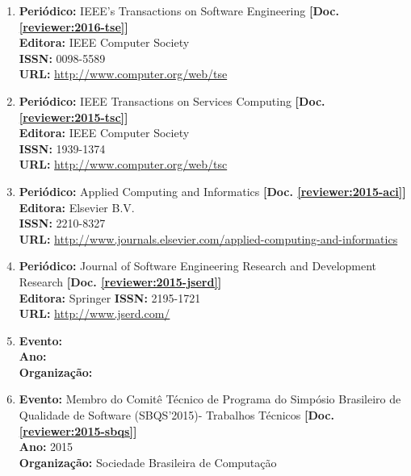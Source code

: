 \documentclass[a4paper,oneside,10pt]{article}
\begin{document}
\begin{enumerate}
\renewcommand{\labelenumi}{{\large\bfseries\arabic{enumi}.}}

\item   \textbf{Peri\'{o}dico:} IEEE’s Transactions on Software Engineering \textbf{[Doc. \ref{reviewer:2016-tse}]}\\
        \textbf{Editora:} IEEE Computer Society\\
        \textbf{ISSN:} 0098-5589\\
        \textbf{URL:} \url{http://www.computer.org/web/tse}

\item   \textbf{Peri\'{o}dico:} IEEE Transactions on Services Computing \textbf{[Doc. \ref{reviewer:2015-tsc}]}\\
        \textbf{Editora:} IEEE Computer Society\\
        \textbf{ISSN:} 1939-1374\\
        \textbf{URL:} \url{http://www.computer.org/web/tsc}

\item   \textbf{Peri\'{o}dico:} Applied Computing and Informatics \textbf{[Doc. \ref{reviewer:2015-aci}]}\\
        \textbf{Editora:} Elsevier B.V.\\
        \textbf{ISSN:} 2210-8327\\
        \textbf{URL:} \url{http://www.journals.elsevier.com/applied-computing-and-informatics}

\item   \textbf{Peri\'{o}dico:} Journal of Software Engineering Research and Development Research \textbf{[Doc. \ref{reviewer:2015-jserd}]}\\
        \textbf{Editora:} Springer
        \textbf{ISSN:} 2195-1721\\
        \textbf{URL:} \url{http://www.jserd.com/}

\item \textbf{Evento:} \\
      \textbf{Ano:}  \\
      \textbf{Organiza\c{c}\~{a}o:} 

\item \textbf{Evento:} Membro do Comitê Técnico de Programa do Simpósio Brasileiro de Qualidade de Software (SBQS'2015)- Trabalhos Técnicos \textbf{[Doc. \ref{reviewer:2015-sbqs}]}\\
      \textbf{Ano:} 2015 \\
      \textbf{Organiza\c{c}\~{a}o:} Sociedade Brasileira de Computa\c{c}\~{a}o


\end{enumerate}
\end{document}

